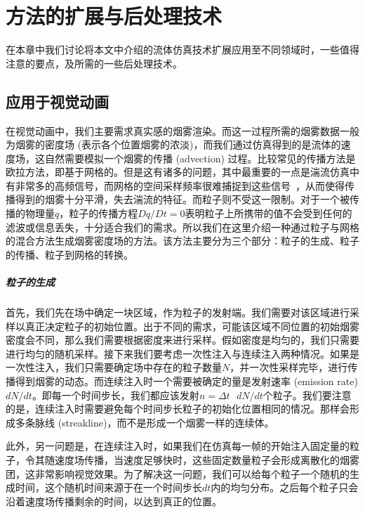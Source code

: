 \chapter{方法的扩展与后处理技术}
\label{chap:caa}

在本章中我们讨论将本文中介绍的流体仿真技术扩展应用至不同领域时，一些值得注意的要点，及所需的一些后处理技术。

\section{应用于视觉动画}
在视觉动画中，我们主要需求真实感的烟雾渲染。而这一过程所需的烟雾数据一般为烟雾的密度场 (表示各个位置烟雾的浓淡)，而我们通过仿真得到的是流体的速度场，这自然需要模拟一个烟雾的传播 (advection) 过程。比较常见的传播方法是欧拉方法，即基于网格的。但是这有诸多的问题，其中最重要的一点是湍流仿真中有非常多的高频信号，而网格的空间采样频率很难捕捉到这些信号~\cite{bridson2015fluid}，从而使得传播得到的烟雾十分平滑，失去湍流的特征。而粒子则不受这一限制。对于一个被传播的物理量$q$，粒子的传播方程$Dq/Dt=0$表明粒子上所携带的值不会受到任何的滤波或信息丢失，十分适合我们的需求。所以我们在这里介绍一种通过粒子与网格的混合方法生成烟雾密度场的方法。该方法主要分为三个部分：粒子的生成、粒子的传播、粒子到网格的转换。

\paragraph{粒子的生成}
首先，我们先在场中确定一块区域，作为粒子的发射端。我们需要对该区域进行采样以真正决定粒子的初始位置。出于不同的需求，可能该区域不同位置的初始烟雾密度会不同，那么我们需要根据密度来进行采样。假如密度是均匀的，我们只需要进行均匀的随机采样。接下来我们要考虑一次性注入与连续注入两种情况。如果是一次性注入，我们只需要确定场中存在的粒子数量$N$，并一次性采样完毕，进行传播得到烟雾的动态。而连续注入时一个需要被确定的量是发射速率 (emission rate) $d$$N/dt$。即每一个时间步长，我们都应该发射$n=\Delta t \text{ }$$d$$N/dt$个粒子。我们要注意的是，连续注入时需要避免每个时间步长粒子的初始化位置相同的情况。那样会形成多条脉线 (streakline)，而不是形成一个烟雾一样的连续体。

此外，另一问题是，在连续注入时，如果我们在仿真每一帧的开始注入固定量的粒子，令其随速度场传播，当速度足够快时，这些固定数量粒子会形成离散化的烟雾团，这非常影响视觉效果。为了解决这一问题，我们可以给每个粒子一个随机的生成时间，这个随机时间来源于在一个时间步长$dt$内的均匀分布。之后每个粒子只会沿着速度场传播剩余的时间，以达到真正的位置。


